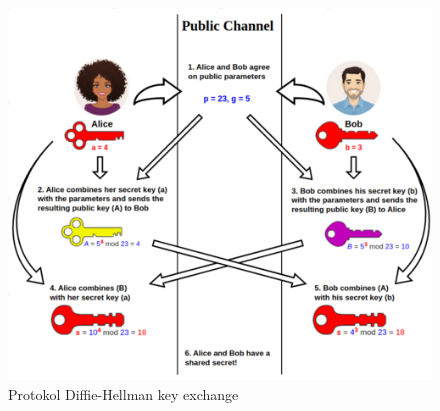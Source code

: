 \documentclass[aspectratio=169]{beamer}
\theoremstyle{definition}
\numberwithin{definisi}{section}
\begin{document}
\begin{frame}
  \frametitle{\insertsection}
  \begin{figure}[h!]
    \centering
    \includegraphics[scale=0.4]{DiffieHellman}

    \caption{Protokol Diffie-Hellman key exchange}
  \end{figure}
\end{frame}
\end{document}

